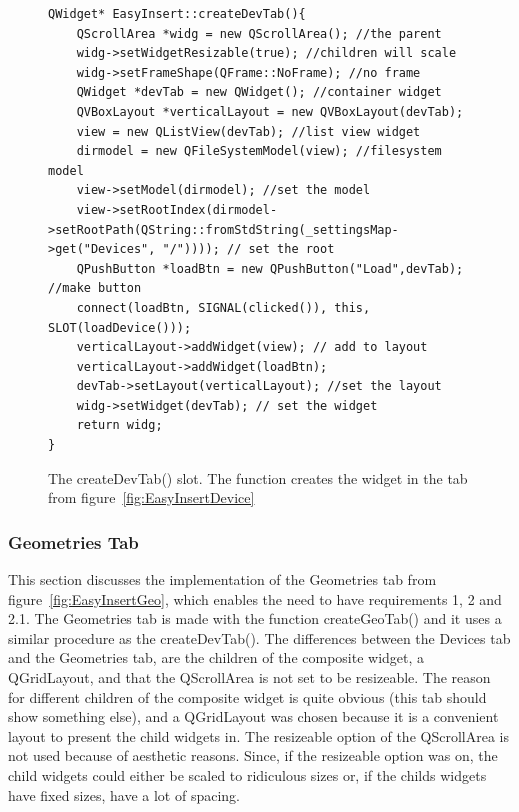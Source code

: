 \begin{figure}[h] %
\centering
\lstset{language=C++} 
\begin{lstlisting}[frame=single]  
QWidget* EasyInsert::createDevTab(){
	QScrollArea *widg = new QScrollArea(); //the parent 
	widg->setWidgetResizable(true); //children will scale 
	widg->setFrameShape(QFrame::NoFrame); //no frame 
	QWidget *devTab = new QWidget(); //container widget
	QVBoxLayout *verticalLayout = new QVBoxLayout(devTab); 
	view = new QListView(devTab); //list view widget
	dirmodel = new QFileSystemModel(view); //filesystem model
	view->setModel(dirmodel); //set the model
	view->setRootIndex(dirmodel->setRootPath(QString::fromStdString(_settingsMap->get("Devices", "/")))); // set the root
	QPushButton *loadBtn = new QPushButton("Load",devTab); //make button
	connect(loadBtn, SIGNAL(clicked()), this, SLOT(loadDevice())); 
	verticalLayout->addWidget(view); // add to layout
	verticalLayout->addWidget(loadBtn);
	devTab->setLayout(verticalLayout); //set the layout
	widg->setWidget(devTab); // set the widget
	return widg;
}
\end{lstlisting}
\caption{The createDevTab() slot. The function creates the widget in the tab from figure~\ref{fig:EasyInsertDevice}}
\label{fig:deviceTabCode} 	
\end{figure}

\subsubsection{Geometries Tab}
\label{sec:GeoTab}
This section discusses the implementation of the Geometries tab from figure~\ref{fig:EasyInsertGeo}, which enables the need to have requirements 1, 2 and 2.1. The Geometries tab is made with the function createGeoTab() and it uses a similar procedure as the createDevTab(). The differences between the Devices tab and the Geometries tab, are the children of the composite widget, a QGridLayout, and that the QScrollArea is not set to be resizeable. The reason for different children of the composite widget is quite obvious (this tab should show something else), and a QGridLayout was chosen because it is a convenient layout to present the child widgets in. The resizeable option of the QScrollArea is not used because of aesthetic reasons. Since, if the resizeable option was on, the child widgets could either be scaled to ridiculous sizes or, if the childs widgets have fixed sizes, have a lot of spacing. 

